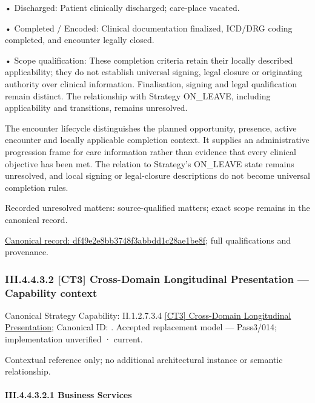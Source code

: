 •
Discharged: Patient clinically discharged; care-place vacated.



•
Completed / Encoded: Clinical documentation finalized, ICD/DRG coding completed, and encounter legally closed.



•
Scope qualification: These completion criteria retain their locally described applicability; they do not establish universal signing, legal closure or originating authority over clinical information. Finalisation, signing and legal qualification remain distinct. The relationship with Strategy ON\_LEAVE, including applicability and transitions, remains unresolved.



The encounter lifecycle distinguishes the planned opportunity, presence, active encounter and locally applicable completion context. It supplies an administrative progression frame for care information rather than evidence that every clinical objective has been met. The relation to Strategy's ON\_LEAVE state remains unresolved, and local signing or legal-closure descriptions do not become universal completion rules.


{\small Recorded unresolved matters: source-qualified matters; exact scope remains in the canonical record.}\par
{\footnotesize \href{../../../../../../../continuum/business/business-process/df49e2e8bb3748f3abbdd1c28ae1be8f.md}{Canonical record: df49e2e8bb3748f3abbdd1c28ae1be8f}; full qualifications and provenance.}\par
\subsubsection*{III.4.4.3.2 [CT3] Cross-Domain Longitudinal Presentation — Capability context}
\label{navigation:III.4.4.3.2}

{\small Canonical Strategy Capability: II.1.2.7.3.4 \hyperref[element:81161f005d8f40c8a552e1138c192819]{[CT3] Cross-Domain Longitudinal Presentation}; Canonical ID: \texttt{}. Accepted replacement model — Pass3/014; implementation unverified · current.}\par
Contextual reference only; no additional architectural instance or semantic relationship.\par
\paragraph*{III.4.4.3.2.1 Business Services}
\label{navigation:III.4.4.3.2.1}

